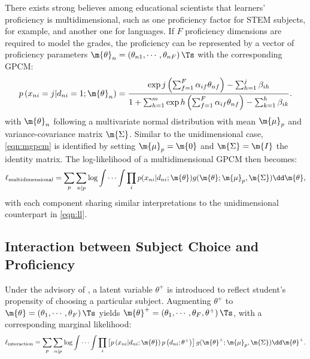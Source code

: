 There exists strong believes among educational scientists that learners' proficiency is multidimensional, such as one proficiency factor for STEM subjects, for example, and another one for languages. If $F$ proficiency dimensions are required to model the grades, the proficiency can be represented by a vector of proficiency parameters $\m{\theta}_n=\left(\theta_{n1}, \cdots, \theta_{nF}\right)\Ts$ with the corresponding GPCM:
\begin{equation}\label{eqn:mgpcm}
    p \left( x_{ni} = j | d_{ni} = 1; \m{\theta}_n \right) =
    \frac{ \exp{ j \left( \sum_{f=1}^F \alpha_{if} \theta_{nf} \right) - \sum_{h=1}^j \beta_{ih} } }{ 1 + \sum_{h=1}^m \exp{ h \left( \sum_{f=1}^F \alpha_{if} \theta_{nf} \right) - \sum_{k=1}^h \beta_{ik} } }.
\end{equation}
with $\m{\theta}_n$ following a multivariate normal distribution with mean $\m{\mu}_p$ and variance-covariance matrix $\m{\Sigma}$. Similar to the unidimensional case, \cref{eqn:mgpcm} is identified by setting $\m{\mu}_p=\m{0}$ and $\m{\Sigma} = \m{I}$ the identity matrix. The log-likelihood of a multidimensional GPCM then becomes:
\begin{equation}\label{eqn:mll}
    \ell_\text{multidimensional} = \sum_{p} \sum_{n | p} \log \int \cdots \int \prod_i p( x_{ni} | d_{ni}; \m{\theta} ) g( \m{\theta}; \m{\mu}_p, \m{\Sigma} ) \dd \m{\theta},
\end{equation}
with each component sharing similar interpretations to the unidimensional counterpart in \cref{eqn:ll}.

\subsection{Interaction between Subject Choice and Proficiency}

Under the advisory of \textcite{korobko:2008}, a latent variable $\theta^+$ is introduced to reflect student's propensity of choosing a particular subject. Augmenting $\theta^+$ to $\m{\theta}=\left(\theta_1, \cdots, \theta_F\right)\Ts$ yields $\m{\theta}^+=\left(\theta_1, \cdots, \theta_F, \theta^+\right)\Ts$, with a corresponding marginal likelihood:
\begin{equation}\label{eqn:lli}
    \ell_\text{interaction} = \sum_p \sum_{ n | p} \log \int \cdots \int \prod_i \left[ p \left( x_{ni} | d_{ni}; \m{\theta} \right) p \left( d_{ni}; \theta^+ \right) \right] g(\m{\theta}^+; \m{\mu}_p, \m{\Sigma}) \dd \m{\theta}^+ .
\end{equation}
